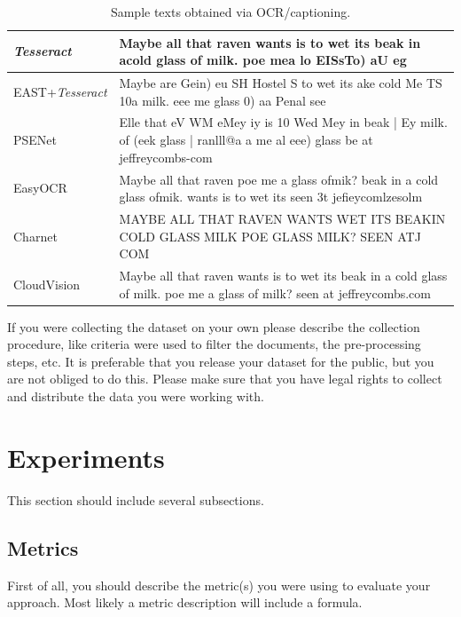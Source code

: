 \documentclass{zapiski}
\begin{document}
\begin{table}[!tbh]\setlength{\tabcolsep}{2pt}
\begin{tabular}{p{.17\linewidth}|p{.79\linewidth}}
\hline
\emph{Tesseract}\newline  \cite{smith2007overview} & 
Maybe all that raven
wants is to wet its
beak in acold glass of milk.
poe mea lo EISsTo) aU eg
\\\hline
EAST+\newline\emph{Tesseract}\newline\cite{kopeykina2019automatic} & 
Maybe are Gein) eu SH Hostel S to wet its ake cold Me TS 10a milk. eee me glass 0) aa Penal see 
\\\hline
PSENet \newline \cite{wang2019shape} &  Elle that eV WM eMey iy is 10 Wed Mey in beak | Ey milk. of (eek glass | ranlll@a a me al eee) glass be at jeffreycombs-com  \\ \hline
EasyOCR \newline \cite{easyocr} &  Maybe all that raven poe me a glass ofmik? beak in a cold glass ofmik. wants is to wet its seen 3t jefieycomlzesolm  \\ \hline
Charnet \newline \cite{xing2019convolutional} & MAYBE ALL THAT RAVEN WANTS WET ITS BEAKIN COLD GLASS MILK POE GLASS MILK? SEEN ATJ COM 
\\ \hline
CloudVision \newline \cite{otani2018} & Maybe all that raven
wants is to wet its
beak in a cold glass of milk.
poe me a glass of milk?
seen at jeffreycombs.com
 \\\hline
\end{tabular}

\caption{Sample  texts obtained via OCR/captioning.}\label{tab:ocr}
\end{table}

If you were collecting the dataset on your own please describe the collection procedure, like criteria were used to filter the documents, the pre-processing steps, etc. It is preferable that you release your dataset for the public, but you are not obliged to do this. Please make sure that you have legal rights to collect and distribute the data you were working with.

\section{Experiments}
This section should include several subsections.
\subsection{Metrics}
First of all, you should describe the metric(s) you were using to evaluate your approach. Most likely a metric description will include a formula.
\end{document}
